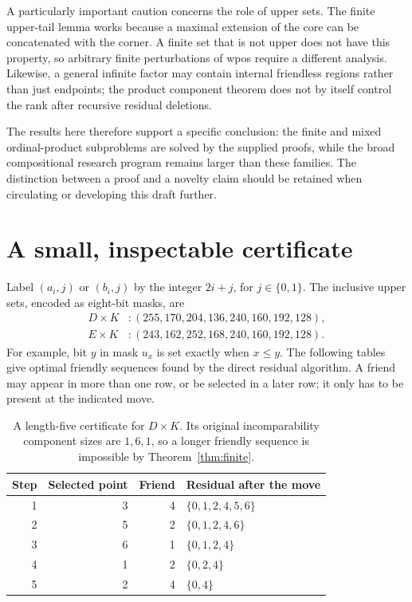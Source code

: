 \documentclass[11pt,letterpaper]{article}
\theoremstyle{definition}
\theoremstyle{remark}
\begin{document}
A particularly important caution concerns the role of upper sets. The
finite upper-tail lemma works because a maximal extension of the core
can be concatenated with the corner. A finite set that is not upper does
not have this property, so arbitrary finite perturbations of wpos require
a different analysis. Likewise, a general infinite factor may contain
internal friendless regions rather than just endpoints; the product
component theorem does not by itself control the rank after recursive
residual deletions.

The results here therefore support a specific conclusion: the finite and
mixed ordinal-product subproblems are solved by the supplied proofs,
while the broad compositional research program remains larger than these
families. The distinction between a proof and a novelty claim should be
retained when circulating or developing this draft further.

\clearpage
\appendix
\section{A small, inspectable certificate}\label{app:certificate}

Label $(a_i,j)$ or $(b_i,j)$ by the integer $2i+j$, for $j\in\{0,1\}$.
The inclusive upper sets, encoded as eight-bit masks, are
\[
\begin{aligned}
 D\times K &: (255,170,204,136,240,160,192,128),\\
 E\times K &: (243,162,252,168,240,160,192,128).
\end{aligned}
\]
For example, bit $y$ in mask $u_x$ is set exactly when $x\le y$.
The following tables give optimal friendly sequences found by the direct
residual algorithm. A friend may appear in more than one row, or be
selected in a later row; it only has to be present at the indicated move.

\begin{table}[ht]
\centering
\begin{tabular}{@{}rrrl@{}}
\toprule
Step & Selected point & Friend & Residual after the move\\
\midrule
1 & 3 & 4 & $\{0,1,2,4,5,6\}$\\
2 & 5 & 2 & $\{0,1,2,4,6\}$\\
3 & 6 & 1 & $\{0,1,2,4\}$\\
4 & 1 & 2 & $\{0,2,4\}$\\
5 & 2 & 4 & $\{0,4\}$\\
\bottomrule
\end{tabular}
\caption{A length-five certificate for $D\times K$. Its original
incomparability component sizes are $1,6,1$, so a longer friendly sequence
is impossible by Theorem~\ref{thm:finite}.}
\end{table}
\end{document}
